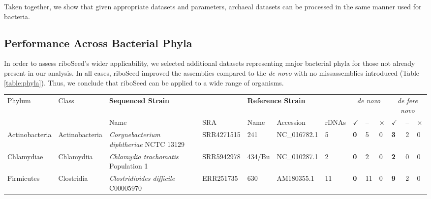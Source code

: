 Taken together, we show that given appropriate datasets and parameters, archaeal datasets can be processed in the same manner used for bacteria.

\subsection*{Performance Across Bacterial Phyla}
In order to assess riboSeed's wider applicability, we selected additional datasets representing major bacterial phyla for those not already present in our analysis. In all cases, riboSeed improved the assemblies compared to the \textit{de novo} with no missassemblies introduced (Table \ref{table:phyla}). Thus, we conclude that riboSeed can be applied to a wide range of organisms.

\begin{sidewaystable}[!hb]
  \centering
  \caption{Comparison of \textit{de novo} and riboSeed's \textit{de fere novo} assemblies}
  \label{table:phyla}
  \begin{tabular}{p{2.25cm}p{2.65cm}p{5.75cm}p{1.75cm}p{2.25cm}p{1.95cm}p{.6cm}>{\hfill}p{.4cm}p{.2cm}p{.1cm}>{\hfill}p{.4cm}p{.2cm}p{.1cm}}
    \toprule
    \multirow{2}{*}{Phylum} & \multirow{2}{*}{Class}  & \multicolumn{2}{l}{\textbf{Sequenced Strain}}  &  \multicolumn{3}{l}{\textbf{Reference Strain}} &  \multicolumn{3}{c}{\textit{de novo}} & \multicolumn{3}{c}{\textit{de fere novo}} \\
    & & Name & SRA & Name & Accession & rDNAs & \textbf{$\checkmark$} & -- & $\times$ & \textbf{$\checkmark$} & -- & $\times$  \\
    \toprule
    Actinobacteria & Actinobacteria        & \textit{Corynebacterium  diphtheriae}   NCTC 13129      & SRR4271515 & 241 &  NC\_016782.1      & 5  & \textbf{0} & 5  & 0 & \textbf{3} & 2 & 0 \\
    Chlamydiae     & Chlamydiia            & \textit{Chlamydia        trachomatis}  Population 1 & SRR5942978 & 434/Bu & NC\_010287.1     & 2  & \textbf{0} & 2  & 0 & \textbf{2} & 0 & 0 \\
    Firmicutes     & Clostridia            & \textit{Clostridioides   difficile}    C00005970                                             & ERR251735  & 630  &AM180355.1       & 11 & \textbf{0} & 11 & 0 & \textbf{9} & 2 & 0 \\

\end{tabular}
\end{sidewaystable}
